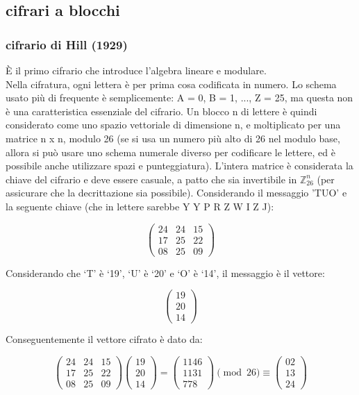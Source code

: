 \documentclass[10pt,a4paper]{article}
\begin{document}
\subsection{cifrari a blocchi}
\subsubsection{cifrario di Hill (1929)}
È il primo cifrario che introduce l'algebra lineare e modulare.\\
Nella cifratura, ogni lettera è per prima cosa codificata in numero. Lo schema usato più di frequente è semplicemente: A = 0, B = 1, ..., Z = 25, ma questa non è una caratteristica essenziale del cifrario. Un blocco n di lettere è quindi considerato come uno spazio vettoriale di dimensione n, e moltiplicato per una matrice n x n, modulo 26 (se si usa un numero più alto di 26 nel modulo base, allora si può usare uno schema numerale diverso per codificare le lettere, ed è possibile anche utilizzare spazi e punteggiatura). L'intera matrice è considerata la chiave del cifrario e deve essere casuale, a patto che sia invertibile in $\mathbb{Z}_{26}^n$ (per assicurare che la decrittazione sia possibile). Considerando il messaggio 'TUO' e la seguente chiave (che in lettere sarebbe Y Y P R Z W I Z J):

    $$\begin{pmatrix} 24 & 24 & 15 \\ 17 & 25 & 22 \\ 08 & 25 & 09 \end{pmatrix} $$

Considerando che ‘T’ è ‘19’, ‘U’ è ‘20’ e ‘O’ è ‘14’, il messaggio è il vettore:

   $$ \begin{pmatrix} 19 \\ 20 \\ 14 \end{pmatrix}$$

Conseguentemente il vettore cifrato è dato da:

    $$\begin{pmatrix} 24 & 24 & 15 \\ 17 & 25 & 22 \\ 08 & 25 & 09 \end{pmatrix} \begin{pmatrix} 19 \\ 20 \\ 14 \end{pmatrix} = \begin{pmatrix} 1146 \\ 1131 \\ 778 \end{pmatrix} \pmod{26} \equiv \begin{pmatrix} 02 \\ 13 \\ 24 \end{pmatrix} $$
\end{document}
